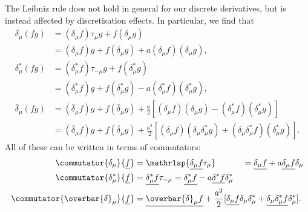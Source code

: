 \documentclass[fleqn]{NotesClass}
\newcommand{\forwardDerivative}{\delta}
\newcommand{\backwardDerivative}{\delta^*}
\newcommand{\centralDerivative}{\overbar{\delta}}
\newcommand{\multiplicative}[1]{\underline{#1}}
\begin{document}
    The Leibniz rule does not hold in general for our discrete derivatives, but is instead affected by discretisation effects.
    In particular, we find that
    \begin{align}
        \forwardDerivative_\mu(fg) &= (\forwardDerivative_\mu f)\tau_\mu g + f(\forwardDerivative_\mu g)\\
        &= (\forwardDerivative_\mu f)g + f(\forwardDerivative_\mu g) + a(\forwardDerivative_\mu f)(\forwardDerivative_\mu g),\\
        \backwardDerivative_\mu(fg) &= (\backwardDerivative_\mu f)\tau_{-\mu}g + f(\backwardDerivative_\mu g)\\
        &= (\backwardDerivative_\mu f)g + f(\backwardDerivative_\mu g) - a(\backwardDerivative_\mu f)(\backwardDerivative_\mu g),\\
        \centralDerivative_\mu(fg) &= (\centralDerivative_\mu f)g + f(\centralDerivative_\mu g) + \frac{a}{2}[(\forwardDerivative_\mu f)(\forwardDerivative_\mu g) - (\backwardDerivative_\mu f)(\backwardDerivative_\mu g)]\\
        &= (\centralDerivative_\mu f)g + f(\centralDerivative_\mu g) + \frac{a^2}{2}[(\forwardDerivative_\mu f)(\forwardDerivative_\mu \backwardDerivative_\mu g) + (\forwardDerivative_\mu \backwardDerivative_\mu f)(\backwardDerivative_\mu g)].
    \end{align}
    All of these can be written in terms of commutators:
    \begin{align}
        \commutator{\forwardDerivative_\mu}{\multiplicative{f}} &= \mathrlap{\multiplicative{\forwardDerivative_\mu f}\tau_\mu}\hphantom{\multiplicative{\backwardDerivative_\mu f}\tau_{-\mu}} = \multiplicative{\forwardDerivative_\mu f} + a \multiplicative{\forwardDerivative_\mu f}\forwardDerivative_\mu\\
        \commutator{\backwardDerivative_\mu}{\multiplicative{f}} &= \multiplicative{\backwardDerivative_\mu f}\tau_{-\mu} = \multiplicative{\backwardDerivative_\mu f} - a\multiplicative{\backwardDerivative f}\backwardDerivative_\mu\\
        \commutator{\centralDerivative_\mu}{\multiplicative{f}} &= \multiplicative{\centralDerivative_\mu f} + \frac{a^2}{2}[\multiplicative{\forwardDerivative_\mu f} \forwardDerivative_\mu \backwardDerivative_\mu + \multiplicative{\forwardDerivative_\mu \backwardDerivative_\mu f} \backwardDerivative_\mu].
    \end{align}
    
\end{document}
